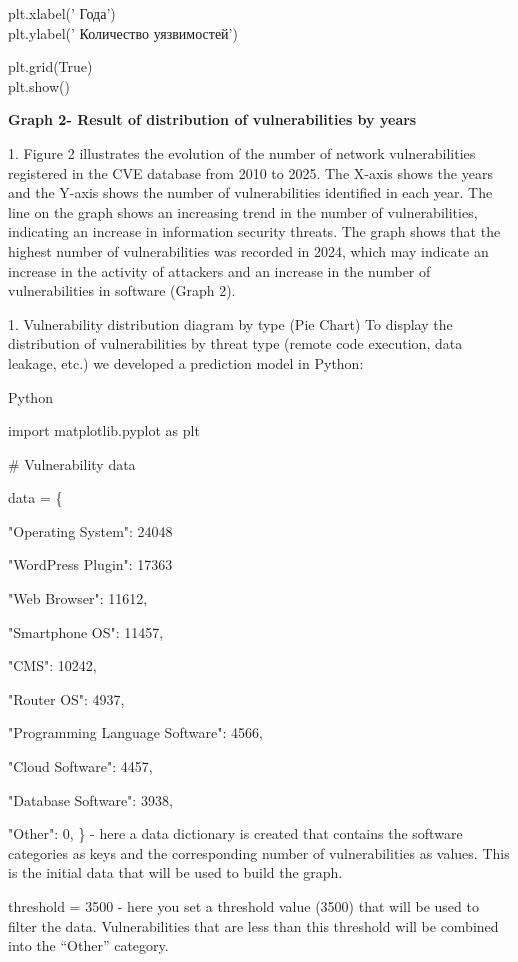 plt.xlabel(' Года')\\
plt.ylabel(' Количество уязвимостей')

plt.grid(True)\\
plt.show()

{\bfseries Graph 2- Result of distribution of vulnerabilities by years}

\def\labelenumi{\arabic{enumi})}

1. Figure 2 illustrates the evolution of the number of network
vulnerabilities registered in the CVE database from 2010 to 2025. The
X-axis shows the years and the Y-axis shows the number of
vulnerabilities identified in each year. The line on the graph shows
an increasing trend in the number of vulnerabilities, indicating an
increase in information security threats. The graph shows that the
highest number of vulnerabilities was recorded in 2024, which may
indicate an increase in the activity of attackers and an increase in
the number of vulnerabilities in software (Graph 2).

1. Vulnerability distribution diagram by type (Pie Chart)
To display the distribution of vulnerabilities by threat type (remote
code execution, data leakage, etc.) we developed a prediction model in
Python:

Python

import matplotlib.pyplot as plt

\# Vulnerability data

data = \{

"Operating System": 24048

"WordPress Plugin": 17363

"Web Browser": 11612,

"Smartphone OS": 11457,

"CMS": 10242,

"Router OS": 4937,

"Programming Language Software": 4566,

"Cloud Software": 4457,

"Database Software": 3938,

"Other": 0, \} - here a data dictionary is created that contains the
software categories as keys and the corresponding number of
vulnerabilities as values. This is the initial data that will be used to
build the graph.

threshold = 3500 - here you set a threshold value (3500) that will be
used to filter the data. Vulnerabilities that are less than this
threshold will be combined into the ``Other'' category.

